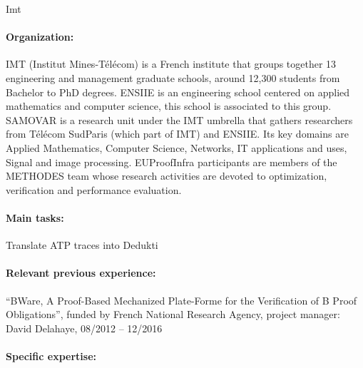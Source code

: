 \begin{sitedescription}{Imt}

\paragraph*{Organization:}
IMT (Institut Mines-T\'el\'ecom) is a French institute that groups together 13 engineering and management graduate schools, around 12,300 students from Bachelor to PhD degrees.
ENSIIE is an engineering school centered on applied mathematics and computer science, this school is associated to this group. SAMOVAR is a research unit under the IMT umbrella that gathers researchers from T\'el\'ecom SudParis (which part of IMT) and ENSIIE. Its key domains are Applied Mathematics,  Computer Science, Networks, IT applications and uses, Signal and image processing. EUProofInfra participants are members of the METHODES team whose research activities are devoted to
optimization, verification and performance evaluation.

\paragraph*{Main tasks:}

\begin{compactitem}
\item Translate ATP traces into Dedukti 


\end{compactitem}


\paragraph*{Relevant previous experience:}

\begin{compactitem}
\item ``BWare, A Proof-Based Mechanized Plate-Forme for the Verification of B Proof Obligations'',
funded by French National Research Agency, project manager: David
Delahaye, 08/2012 -- 12/2016
\end{compactitem}



\paragraph*{Specific expertise:}



\end{sitedescription}
